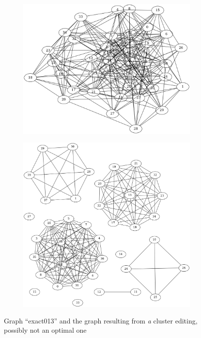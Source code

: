 \documentclass[12pt,oneside,english,parskip=full,headings=small]{scrbook}
\theoremstyle{definition}
\begin{document}
\begin{figure}[h]
	\centering
	\begin{subfigure}{0.49\textwidth}
		\includegraphics[width=1.0\linewidth]{exact013-input}
	\end{subfigure}
	\begin{subfigure}{0.49\textwidth}
		\includegraphics[width=1.0\linewidth]{exact013-output-inexact}
	\end{subfigure}
	\caption{Graph ``exact013'' and the graph resulting from \emph{a} cluster editing, possibly not
	an optimal one}
	\label{fig:exact013}
\end{figure}
\end{document}
